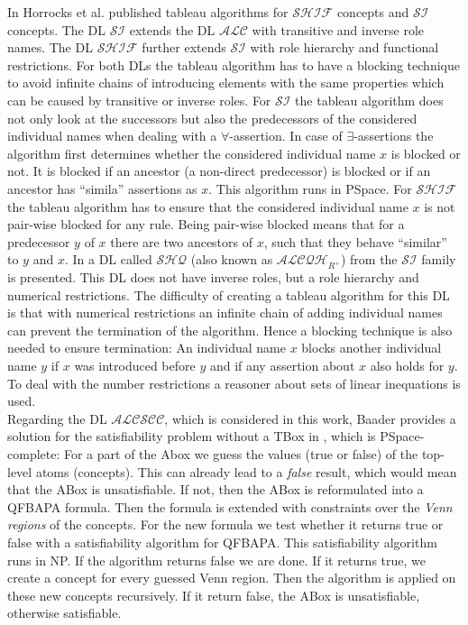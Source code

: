 \documentclass{book}
\theoremstyle{break}
\theoremstyle{definition}
\begin{document}
In \cite{2} Horrocks et al. published tableau algorithms for $\mathcal{SHIF}$ concepts and $\mathcal{SI}$ concepts. The DL $\mathcal{SI}$ extends the DL $\mathcal{ALC}$ with transitive and inverse role names. The DL $\mathcal{SHIF}$ further extends $\mathcal{SI}$ with role hierarchy and functional restrictions. For both DLs the tableau algorithm has to have a blocking technique to avoid infinite chains of introducing elements with the same properties which can be caused by transitive or inverse roles. For $\mathcal{SI}$ the tableau algorithm does not only look at the successors but also the predecessors of the considered individual names when dealing with a $\forall$-assertion. In case of $\exists$-assertions the algorithm first determines whether the considered individual name $x$ is blocked or not. It is blocked if an ancestor (a non-direct predecessor) is blocked or if an ancestor has ``simila'' assertions as $x$. This algorithm runs in PSpace. For $\mathcal{SHIF}$ the tableau algorithm has to ensure that the considered individual name $x$ is not pair-wise blocked for any rule. Being pair-wise blocked means that for a predecessor $y$ of $x$ there are two ancestors of $x$, such that they behave ``similar'' to $y$ and $x$. In \cite{alcqh} a DL called $\mathcal{SHQ}$ (also known as $\mathcal{ALCQH}_{R^+}$) from the $\mathcal{SI}$ family is presented. This DL does not have inverse roles, but a role hierarchy and numerical restrictions. The difficulty of creating a tableau algorithm for this DL is that with numerical restrictions an infinite chain of adding individual names can prevent the termination of the algorithm. Hence a blocking technique is also needed to ensure termination: An individual name $x$ blocks another individual name $y$ if $x$ was introduced before $y$ and if any assertion about $x$ also holds for $y$. To deal with the number restrictions a reasoner about sets of linear inequations is used.\\
Regarding the DL $\mathcal{ALCSCC}$, which is considered in this work, Baader provides a solution for the satisfiability problem without a TBox in \cite{4}, which is PSpace-complete: For a part of the Abox we guess the values (true or false) of the top-level atoms (concepts). This can already lead to a \textit{false} result, which would mean that the ABox is unsatisfiable. If not, then the ABox is reformulated into a QFBAPA formula. Then the formula is extended with constraints over the \textit{Venn regions} of the concepts. For the new formula we test whether it returns true or false with a satisfiability algorithm for QFBAPA. This satisfiability algorithm runs in NP. If the algorithm returns false we are done. If it returns true, we create a concept for every guessed Venn region. Then the algorithm is applied on these new concepts recursively. If it return false, the ABox is unsatisfiable, otherwise satisfiable.
\end{document}
